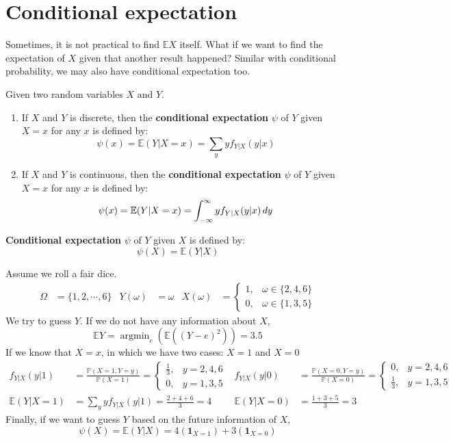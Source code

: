 \documentclass{huhtakm-template-book}
\newcommand{\prob}{\mathbb{P}}
\newcommand{\expect}{\mathbb{E}}
\DeclareMathOperator*{\argmin}{argmin}
\begin{document}
\newpage
\section{Conditional expectation}
Sometimes, it is not practical to find $\expect{X}$ itself. What if we want to find the expectation of $X$ given that another result happened? Similar with conditional probability, we may also have conditional expectation too.
\begin{defn}
	Given two random variables $X$ and $Y$.
	\begin{enumerate}
		\item If $X$ and $Y$ is discrete, then the \textbf{conditional expectation} $\psi$ of $Y$ given $X=x$ for any $x$ is defined by:
		\begin{equation*}
			\psi(x)=\expect(Y|X=x)=\sum_{y}yf_{Y|X}(y|x)
		\end{equation*}
		\item If $X$ and $Y$ is continuous, then the \textbf{conditional expectation} $\psi$ of $Y$ given $X=x$ for any $x$ is defined by:
		\begin{equation*}
			\psi(x)=\expect(Y|X=x)=\intinfty yf_{Y|X}(y|x)\,dy
		\end{equation*}
	\end{enumerate}
	\textbf{Conditional expectation} $\psi$ of $Y$ given $X$ is defined by:
	\begin{equation*}
		\psi(X)=\expect(Y|X)
	\end{equation*}
\end{defn}
\begin{eg}
	Assume we roll a fair dice.
	\begin{align*}
		\Omega&=\{1,2,\cdots,6\} & Y(\omega)&=\omega & X(\omega)&=\begin{cases}
			1, &\omega\in\{2,4,6\}\\
			0, &\omega\in\{1,3,5\}
		\end{cases}
	\end{align*}
	We try to guess $Y$. If we do not have any information about $X$, 
	\begin{equation*}
		\expect Y=\argmin_{e}(\expect((Y-e)^{2}))=3.5
	\end{equation*}
	If we know that $X=x$, in which we have two cases: $X=1$ and $X=0$
	\begin{align*}
		f_{Y|X}(y|1)&=\frac{\prob(X=1,Y=y)}{\prob(X=1)}=\begin{cases}
			\frac{1}{3}, &y=2,4,6\\
			0, &y=1,3,5
		\end{cases} & f_{Y|X}(y|0)&=\frac{\prob(X=0,Y=y)}{\prob(X=0)}=\begin{cases}
			0, &y=2,4,6\\
			\frac{1}{3}, &y=1,3,5
		\end{cases}\\
		\expect(Y|X=1)&=\sum_{y}yf_{Y|X}(y|1)=\frac{2+4+6}{3}=4 & \expect(Y|X=0)&=\frac{1+3+5}{3}=3
	\end{align*}
	Finally, if we want to guess $Y$ based on the future information of $X$,
	\begin{equation*}
		\psi(X)=\expect(Y|X)=4(\mathbf{1}_{X=1})+3(\mathbf{1}_{X=0})
	\end{equation*}
\end{eg}
\end{document}
